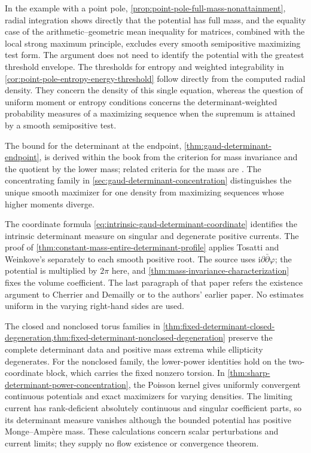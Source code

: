 In the example with a point pole, \cref{prop:point-pole-full-mass-nonattainment}, radial integration shows directly that the potential has full mass, and the equality case of the arithmetic--geometric mean inequality for matrices, combined with the local strong maximum principle, excludes every smooth semipositive maximizing test form. The argument does not need to identify the potential with the greatest threshold envelope. The thresholds for entropy and weighted integrability in \cref{cor:point-pole-entropy-energy-threshold} follow directly from the computed radial density. They concern the density of this single equation, whereas the question of uniform moment or entropy conditions concerns the determinant-weighted probability measures of a maximizing sequence when the supremum is attained by a smooth semipositive test.

The bound for the determinant at the endpoint, \cref{thm:gaud-determinant-endpoint}, is derived within the book from the criterion for mass invariance and the quotient by the lower mass; related criteria for the mass are \cite[Propositions~3.2 and 3.3(iv)]{GL22}. The concentrating family in \cref{sec:gaud-determinant-concentration} distinguishes the unique smooth maximizer for one density from maximizing sequences whose higher moments diverge.

The coordinate formula \eqref{eq:intrinsic-gaud-determinant-coordinate} identifies the intrinsic determinant measure on singular and degenerate positive currents. The proof of \cref{thm:constant-mass-entire-determinant-profile} applies Tosatti and Weinkove's \cite[Corollary~1]{TW10} separately to each smooth positive root. The source uses $\mathrm i\partial\bar\partial\varphi$; the potential is multiplied by $2\pi$ here, and \cref{thm:mass-invariance-characterization} fixes the volume coefficient. The last paragraph of that paper refers the existence argument to Cherrier and Demailly or to the authors' earlier paper. No estimates uniform in the varying right-hand sides are used.

The closed and nonclosed torus families in \cref{thm:fixed-determinant-closed-degeneration,thm:fixed-determinant-nonclosed-degeneration} preserve the complete determinant data and positive mass extrema while ellipticity degenerates. For the nonclosed family, the lower-power identities hold on the two-coordinate block, which carries the fixed nonzero torsion. In \cref{thm:sharp-determinant-power-concentration}, the Poisson kernel gives uniformly convergent continuous potentials and exact maximizers for varying densities. The limiting current has rank-deficient absolutely continuous and singular coefficient parts, so its determinant measure vanishes although the bounded potential has positive Monge--Amp\`ere mass. These calculations concern scalar perturbations and current limits; they supply no flow existence or convergence theorem.

